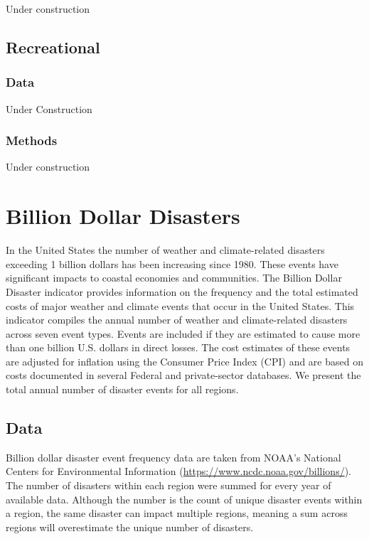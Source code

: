 \documentclass[
]{book}
\begin{document}
Under construction

\hypertarget{recreational}{%
\section{Recreational}\label{recreational}}

\hypertarget{data-18}{%
\subsection{Data}\label{data-18}}

Under Construction

\hypertarget{methods-18}{%
\subsection{Methods}\label{methods-18}}

Under construction

\hypertarget{billion-dollar-disasters}{%
\chapter{Billion Dollar Disasters}\label{billion-dollar-disasters}}

In the United States the number of weather and climate-related disasters exceeding 1 billion dollars has been increasing since 1980. These events have significant impacts to coastal economies and communities. The Billion Dollar Disaster indicator provides information on the frequency and the total estimated costs of major weather and climate events that occur in the United States. This indicator compiles the annual number of weather and climate-related disasters across seven event types. Events are included if they are estimated to cause more than one billion U.S. dollars in direct losses. The cost estimates of these events are adjusted for inflation using the Consumer Price Index (CPI) and are based on costs documented in several Federal and private-sector databases. We present the total annual number of disaster events for all regions.

\hypertarget{data-19}{%
\section{Data}\label{data-19}}

Billion dollar disaster event frequency data are taken from NOAA's National Centers for Environmental Information (\url{https://www.ncdc.noaa.gov/billions/}). The number of disasters within each region were summed for every year of available data. Although the number is the count of unique disaster events within a region, the same disaster can impact multiple regions, meaning a sum across regions will overestimate the unique number of disasters.
\end{document}
